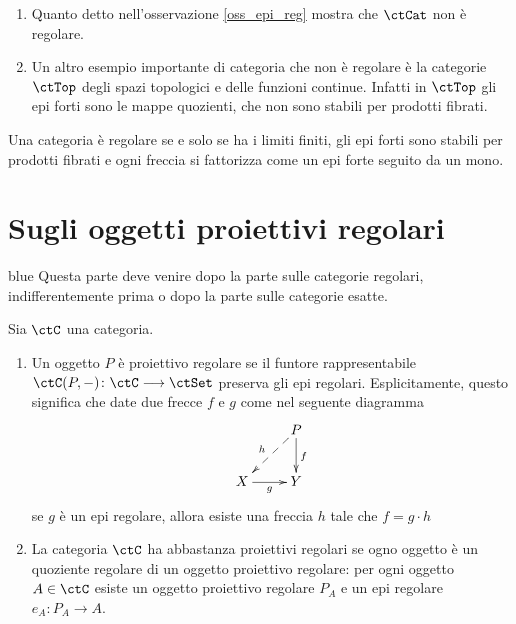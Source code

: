 \begin{examples}\label{esempio_non_reg}
 \hfill
 \begin{enumerate}
  \item Quanto detto nell'osservazione \ref{oss_epi_reg} mostra che \(\ctCat\) non è regolare.
  \item Un altro esempio importante di categoria che non è regolare è la categorie \(\ctTop\) degli spazi topologici e delle
        funzioni continue. Infatti in \(\ctTop\) gli epi forti sono le mappe quozienti, che non sono stabili per prodotti fibrati.
 \end{enumerate}
\end{examples}

\begin{exercise}\label{esercizio_def_cat_reg}
 Una categoria è regolare se e solo se ha i limiti finiti, gli epi forti sono stabili per prodotti fibrati e
 ogni freccia si fattorizza come un epi forte seguito da un mono.
\end{exercise}

\section{Sugli oggetti proiettivi regolari}\label{sec_proj_reg}

\begin{color}{blue}
 Questa parte deve venire dopo la parte sulle categorie regolari, indifferentemente prima o dopo la parte sulle categorie esatte.
\end{color}

\begin{definition}\label{def_ogg_pro_reg}
 Sia \(\ctC\) una categoria.
 \begin{enumerate}
  \item Un oggetto \(P\) è proiettivo regolare se il funtore rappresentabile \(\ctC(P,-) \colon \ctC \fun \ctSet\) preserva gli
        epi regolari. Esplicitamente, questo significa che date due frecce \(f\) e \(g\) come nel seguente diagramma
        \[\xymatrix{ & P \ar@{-->}[ld]_{h} \ar[d]^{f} \\ X \ar[r]_-{g} & Y}\]
        se \(g\) è un epi regolare, allora esiste una freccia \(h\) tale che \(f = g \cdot h\)

  \item La categoria \(\ctC\) ha abbastanza proiettivi regolari se ogno oggetto è un quoziente regolare di un oggetto proiettivo
        regolare: per ogni oggetto \(A \in \ctC\) esiste un oggetto proiettivo regolare \(P_A\) e un epi regolare \(e_A \colon P_A \to A\).
 \end{enumerate}
\end{definition}

